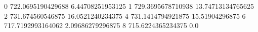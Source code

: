 0 722.0695190429688 6.44708251953125
1 729.3695678710938 13.74713134765625
2 731.674560546875 16.0521240234375
4 731.1414794921875 15.51904296875
6 717.7192993164062 2.09686279296875
8 715.6224365234375 0.0
